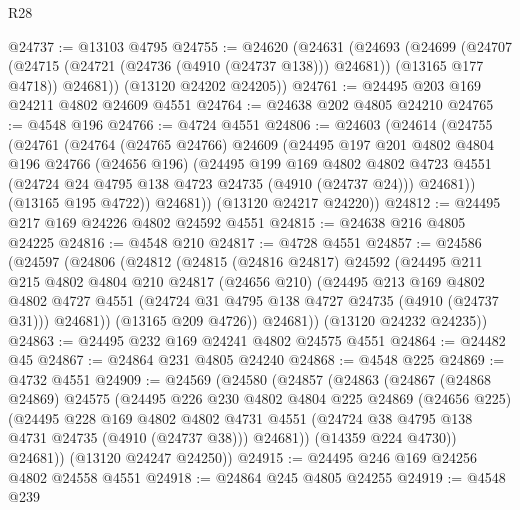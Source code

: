 \begin{lexlean}{R28}
\begin{coremodule}
@24737 := @13103 @4795
@24755 := @24620
    (@24631
      (@24693
        (@24699
          (@24707 (@24715 (@24721 (@24736 (@4910 (@24737 @138))) @24681)) (@13165 @177 @4718))
          @24681))
      (@13120 @24202 @24205))
@24761 := @24495 @203 @169 @24211 @4802 @24609 @4551
@24764 := @24638 @202 @4805 @24210
@24765 := @4548 @196
@24766 := @4724 @4551
@24806 := @24603
    (@24614
      (@24755
        (@24761
          (@24764
            (@24765 @24766)
            @24609
            (@24495
              @197
              @201
              @4802
              @4804
              @196
              @24766
              (@24656 @196)
              (@24495
                @199
                @169
                @4802
                @4802
                @4723
                @4551
                (@24724 @24 @4795 @138 @4723 @24735 (@4910 (@24737 @24)))
                @24681))
            (@13165 @195 @4722))
          @24681))
      (@13120 @24217 @24220))
@24812 := @24495 @217 @169 @24226 @4802 @24592 @4551
@24815 := @24638 @216 @4805 @24225
@24816 := @4548 @210
@24817 := @4728 @4551
@24857 := @24586
    (@24597
      (@24806
        (@24812
          (@24815
            (@24816 @24817)
            @24592
            (@24495
              @211
              @215
              @4802
              @4804
              @210
              @24817
              (@24656 @210)
              (@24495
                @213
                @169
                @4802
                @4802
                @4727
                @4551
                (@24724 @31 @4795 @138 @4727 @24735 (@4910 (@24737 @31)))
                @24681))
            (@13165 @209 @4726))
          @24681))
      (@13120 @24232 @24235))
@24863 := @24495 @232 @169 @24241 @4802 @24575 @4551
@24864 := @24482 @45
@24867 := @24864 @231 @4805 @24240
@24868 := @4548 @225
@24869 := @4732 @4551
@24909 := @24569
    (@24580
      (@24857
        (@24863
          (@24867
            (@24868 @24869)
            @24575
            (@24495
              @226
              @230
              @4802
              @4804
              @225
              @24869
              (@24656 @225)
              (@24495
                @228
                @169
                @4802
                @4802
                @4731
                @4551
                (@24724 @38 @4795 @138 @4731 @24735 (@4910 (@24737 @38)))
                @24681))
            (@14359 @224 @4730))
          @24681))
      (@13120 @24247 @24250))
@24915 := @24495 @246 @169 @24256 @4802 @24558 @4551
@24918 := @24864 @245 @4805 @24255
@24919 := @4548 @239

\end{coremodule}
\end{lexlean}
